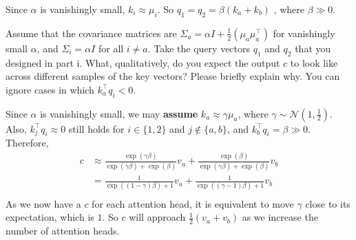 \begin{parts}
\begin{subparts}
        \begin{answer}
            Since $\alpha$ is vanishingly small, $k_i \approx \mu_i$.
            So $q_1 = q_2 = \beta (k_a + k_b)$ , where $\beta \gg 0$.
        \end{answer}

        \subpart[2]
        Assume that the covariance matrices are $\Sigma_a=\alpha I + \frac{1}{2}(\mu_a\mu_a^\top)$ for vanishingly small $\alpha$, and $\Sigma_i=\alpha I$  for all $i \neq a$.
        Take the query vectors $q_1$ and $q_2$ that you designed in part i.
        What, qualitatively, do you expect the output $c$ to look like across different samples of the key vectors? Please briefly explain why. You can ignore cases in which $k_a^\top q_i < 0$.

        \begin{answer}
            Since $\alpha$ is vanishingly small, we may \textbf{assume} $k_a \approx \gamma \mu_a$, where $\gamma \sim \mathcal{N}(1, \frac{1}{2})$.
            Also, $k_j^\top q_i \approx 0$ still holds for $i \in \{1, 2\}$ and $j \notin \{a, b\}$, and $k_b^\top q_i = \beta \gg 0$.
            Therefore, \\
            \[
                \begin{aligned}
                    c &\approx \frac{\exp (\gamma \beta)}{\exp(\gamma \beta) + \exp(\beta)} v_a + \frac{\exp (\beta)}{\exp(\gamma \beta) + \exp(\beta)} v_b \\
                    &= \frac{1}{\exp((1-\gamma) \beta) + 1} v_a + \frac{1}{\exp((\gamma - 1) \beta) + 1} v_b \\
                \end{aligned}
            \]
            As we now have a $c$ for each attention head, it is equivalent to move $\gamma$ close to its expectation, which is $1$.
            So $c$ will approach $\frac{1}{2}(v_a + v_b)$ as we increase the number of attention heads.
        \end{answer}


    \end{subparts}
\end{parts}